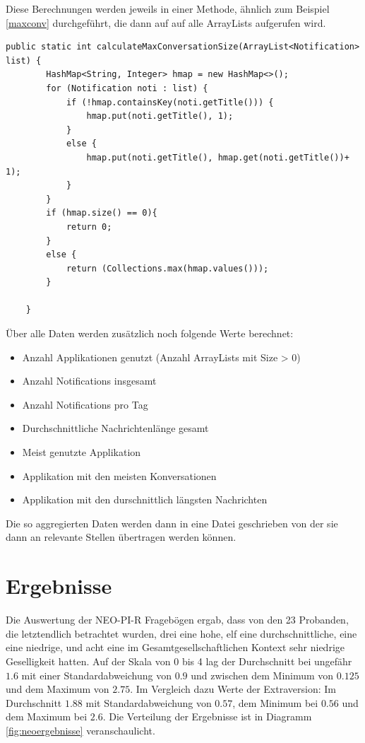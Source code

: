 Diese Berechnungen werden jeweils in einer Methode, ähnlich zum Beispiel \ref{maxconv} durchgeführt, die dann auf auf alle ArrayLists aufgerufen wird.


\begin{lstlisting}[frame=single, caption =  calculateMaxConversationSize(), label=maxconv] 
    public static int calculateMaxConversationSize(ArrayList<Notification> list) {
        HashMap<String, Integer> hmap = new HashMap<>();
        for (Notification noti : list) {
            if (!hmap.containsKey(noti.getTitle())) {
                hmap.put(noti.getTitle(), 1);
            }
            else {
                hmap.put(noti.getTitle(), hmap.get(noti.getTitle())+ 1);
            }
        }
        if (hmap.size() == 0){
            return 0;
        }
        else {
            return (Collections.max(hmap.values()));
        }

    }
\end{lstlisting}


Über alle Daten werden zusätzlich noch folgende Werte berechnet:

\begin{itemize}
  \item Anzahl Applikationen genutzt (Anzahl ArrayLists mit Size > 0)
  \item Anzahl Notifications insgesamt
  \item Anzahl Notifications pro Tag
  \item Durchschnittliche Nachrichtenlänge gesamt
  \item Meist genutzte Applikation
  \item Applikation mit den meisten Konversationen
  \item Applikation mit den durschnittlich längsten Nachrichten  
\end{itemize}

Die so aggregierten Daten werden dann in eine Datei geschrieben von der sie dann an relevante Stellen übertragen werden können.

\section{Ergebnisse}

Die Auswertung der NEO-PI-R Fragebögen ergab, dass von den 23 Probanden, die letztendlich betrachtet wurden, drei eine hohe, elf eine durchschnittliche, eine eine niedrige, und acht eine im Gesamtgesellschaftlichen Kontext sehr niedrige Geselligkeit hatten.
Auf der Skala von 0 bis 4 lag der Durchschnitt bei ungefähr $1.6$ mit einer Standardabweichung von $0.9$ und zwischen dem Minimum von $0.125$ 
und dem Maximum von $2.75$.
Im Vergleich dazu Werte der Extraversion:
Im Durchschnitt $1.88$ mit Standardabweichung von $0.57$, dem Minimum bei $0.56$ und dem Maximum bei $2.6$.
Die Verteilung der Ergebnisse ist in Diagramm \ref{fig:neoergebnisse} veranschaulicht.

